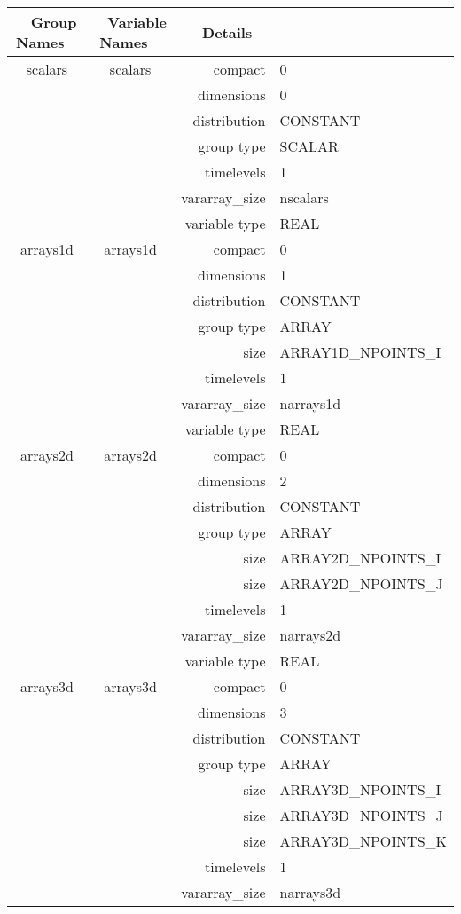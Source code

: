 \begin{tabular*}{150mm}{|c|c@{\extracolsep{\fill}}|rl|} \hline 
~ {\bf Group Names} ~ & ~ {\bf Variable Names} ~  &{\bf Details} ~ & ~\\ 
\hline 
scalars & scalars & compact & 0 \\ 
 &  & dimensions & 0 \\ 
 &  & distribution & CONSTANT \\ 
 &  & group type & SCALAR \\ 
 &  & timelevels & 1 \\ 
 &  & vararray\_size & nscalars \\ 
 &  & variable type & REAL \\ 
\hline 
arrays1d & arrays1d & compact & 0 \\ 
 &  & dimensions & 1 \\ 
 &  & distribution & CONSTANT \\ 
 &  & group type & ARRAY \\ 
 &  & size & ARRAY1D\_NPOINTS\_I \\ 
 &  & timelevels & 1 \\ 
 &  & vararray\_size & narrays1d \\ 
 &  & variable type & REAL \\ 
\hline 
arrays2d & arrays2d & compact & 0 \\ 
 &  & dimensions & 2 \\ 
 &  & distribution & CONSTANT \\ 
 &  & group type & ARRAY \\ 
 &  & size & ARRAY2D\_NPOINTS\_I \\ 
& ~ & size & ARRAY2D\_NPOINTS\_J \\ 
 &  & timelevels & 1 \\ 
 &  & vararray\_size & narrays2d \\ 
 &  & variable type & REAL \\ 
\hline 
arrays3d & arrays3d & compact & 0 \\ 
 &  & dimensions & 3 \\ 
 &  & distribution & CONSTANT \\ 
 &  & group type & ARRAY \\ 
 &  & size & ARRAY3D\_NPOINTS\_I \\ 
& ~ & size & ARRAY3D\_NPOINTS\_J \\ 
 &  & size & ARRAY3D\_NPOINTS\_K \\ 
 &  & timelevels & 1 \\ 
 &  & vararray\_size & narrays3d \\ 

\end{tabular*}

